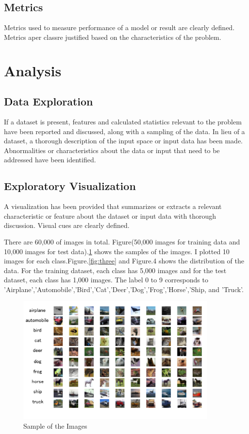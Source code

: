 \documentclass[a4paper,10pt,fleqn]{article}
\begin{document}
\subsection{Metrics}
Metrics used to measure performance of a model or result are clearly defined. Metrics aper classre justified based on the characteristics of the problem.


\section{Analysis}
\subsection{Data Exploration}
If a dataset is present, features and calculated statistics relevant to the problem have been reported and discussed, along with a sampling of the data. In lieu of a dataset, a thorough description of the input space or input data has been made. Abnormalities or characteristics about the data or input that need to be addressed have been identified.





\subsection{Exploratory Visualization}
A visualization has been provided that summarizes or extracts a relevant characteristic or feature about the dataset or input data with thorough discussion. Visual cues are clearly defined.


There are 60,000 of images in total. Figure(50,000 images for training data and 10,000 images for test data).\ref{fig:two} shows the samples of the images. I plotted 10 images for each class.Figure.\ref{fig:three} and Figure.4 shows the distribution of the data. For the training dataset, each class has 5,000 images and for the test dataset, each class has 1,000 images.
The label 0 to 9 corresponds to 'Airplane','Automobile','Bird','Cat','Deer','Dog','Frog','Horse','Ship, and 'Truck'.
\begin{figure}[htbp]

\begin{center}
\includegraphics[width=10cm]{picture/random_sample.png}
\end{center}
\caption{Sample of the Images}
\label{fig:two}

\end{figure}
\end{document}
